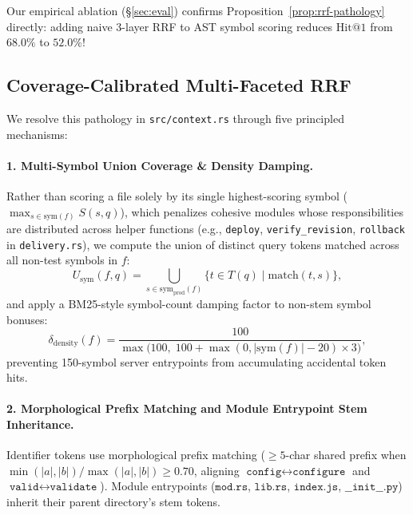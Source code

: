 \documentclass[11pt]{article}
\begin{document}
Our empirical ablation (\S\ref{sec:eval}) confirms Proposition~\ref{prop:rrf-pathology} directly: adding naive 3-layer RRF to AST symbol scoring reduces $\text{Hit@1}$ from $68.0\%$ to $52.0\%$!

\subsection{Coverage-Calibrated Multi-Faceted RRF}

We resolve this pathology in \texttt{src/context.rs} through five principled mechanisms:

\paragraph{1. Multi-Symbol Union Coverage \& Density Damping.}
Rather than scoring a file solely by its single highest-scoring symbol ($\max_{s \in \text{sym}(f)} S(s, q)$), which penalizes cohesive modules whose responsibilities are distributed across helper functions (e.g., \texttt{deploy}, \texttt{verify\_revision}, \texttt{rollback} in \texttt{delivery.rs}), we compute the union of distinct query tokens matched across all non-test symbols in $f$:
\begin{equation}
U_{\text{sym}}(f, q) = \bigcup_{s \in \text{sym}_{\text{prod}}(f)} \{t \in T(q) \mid \text{match}(t, s)\},
\end{equation}
and apply a BM25-style symbol-count damping factor to non-stem symbol bonuses:
\begin{equation}
\delta_{\text{density}}(f) = \frac{100}{\max\bigl(100,\; 100 + \max(0, |\text{sym}(f)| - 20) \times 3\bigr)},
\end{equation}
preventing 150-symbol server entrypoints from accumulating accidental token hits.

\paragraph{2. Morphological Prefix Matching and Module Entrypoint Stem Inheritance.}
Identifier tokens use morphological prefix matching ($\ge 5$-char shared prefix when $\min(|a|, |b|) / \max(|a|, |b|) \ge 0.70$, aligning $\texttt{config} \leftrightarrow \texttt{configure}$ and $\texttt{valid} \leftrightarrow \texttt{validate}$). Module entrypoints ($\texttt{mod.rs}$, $\texttt{lib.rs}$, $\texttt{index.js}$, $\texttt{\_\_init\_\_.py}$) inherit their parent directory's stem tokens.
\end{document}
